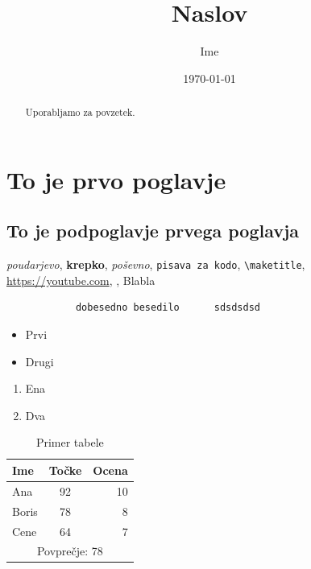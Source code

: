 \documentclass[a4paper,10pt]{article}
\title{Naslov}
\author{Ime}
\date{\today} %
\begin{document}
\maketitle

\begin{abstract}
Uporabljamo za povzetek.
\end{abstract}

\tableofcontents %

\section{
    To je prvo poglavje
}
\blindtext
\subsection{
    To je podpoglavje prvega poglavja
}
\blindtext


\emph{poudarjevo}, \textbf{krepko}, \textit{poševno}, \texttt{pisava za kodo},
 \verb|\maketitle|, %
  \url{https://youtube.com}, \noindent, 
  \centering Blabla
 \begin{verbatim}            dobesedno besedilo      sdsdsdsd
 \end{verbatim}

\begin{itemize}
  \item Prvi
  \item Drugi
\end{itemize}

\begin{enumerate}
  \item Ena
  \item Dva
\end{enumerate}

\begin{table}[h]
\centering
\caption{Primer tabele}
\label{tab:rezultati}
\begin{tabular}{lcr}
\toprule
\textbf{Ime} & \textbf{Točke} & \textbf{Ocena} \\
\midrule
Ana   & 92 & 10 \\
Boris & 78 & 8  \\
Cene  & 64 & 7  \\
\midrule
\multicolumn{3}{c}{Povprečje: 78} \\
\bottomrule
\end{tabular}
\end{table} %
\end{document}
